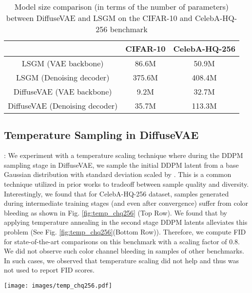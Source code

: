 \documentclass[10pt]{article} \usepackage[accepted]{tmlr}
\begin{document}
\begin{table}[t]
\centering
\footnotesize
\begin{tabular}{@{}ccc@{}}
\toprule
                               & CIFAR-10 & CelebA-HQ-256 \\ \midrule
LSGM (VAE backbone)            & 86.6M    & 50.9M         \\
LSGM (Denoising decoder)       & 375.6M   & 408.4M        \\
DiffuseVAE (VAE backbone)      & 9.2M     & 32.7M         \\
DiffuseVAE (Denoising decoder) & 35.7M    & 113.3M        \\ \bottomrule
\end{tabular}
\caption{Model size comparison (in terms of the number of parameters) between DiffuseVAE and LSGM on the CIFAR-10 and CelebA-HQ-256 benchmark}
\label{table:model_compare}
\end{table}

\subsection{Temperature Sampling in DiffuseVAE}:
We experiment with a temperature scaling technique where during the DDPM sampling stage in DiffuseVAE, we sample the initial DDPM latent  from a base Gaussian distribution with standard deviation scaled by . This is a common technique utilized in prior works \citep{vahdat2021nvae, Kingma2018GlowGF} to tradeoff between sample quality and diversity. Interestingly, we found that for CelebA-HQ-256 dataset, samples generated during intermediate training stages (and even after convergence) suffer from color bleeding as shown in Fig. \ref{fig:temp_chq256} (Top Row). We found that by applying temperature annealing in the second stage DDPM latents alleviates this problem (See Fig. \ref{fig:temp_chq256}(Bottom Row)). Therefore, we compute FID for state-of-the-art comparisons on this benchmark with a scaling factor of 0.8. We did not observe such color channel bleeding in samples of other benchmarks. In such cases, we observed that temperature scaling did not help and thus was not used to report FID scores.

\begin{figure*}[h]
  \centering
    \texttt{[image: images/temp\_chq256.pdf]}
    \caption{Effect of temperature sampling in DDPM latents in DiffuseVAE. (Top Row) Samples generated with . (Bottom Row) Samples generated with }
    \label{fig:temp_chq256}
\end{figure*}
\end{document}
